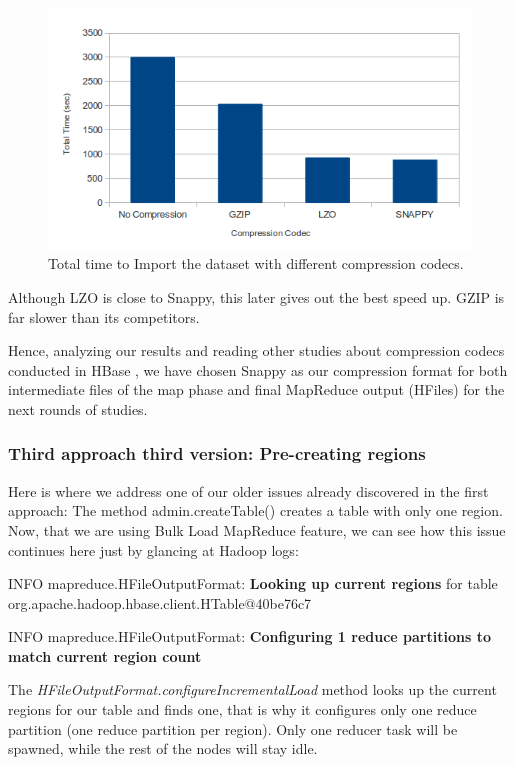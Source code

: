 \begin{figure}[htb]
\centering
\includegraphics[width=1\textwidth]{./images/codecs.png}
\caption{Total time to Import the dataset with different compression codecs.} \label{fig:codecs}
\end{figure}


Although LZO is close to Snappy, this later gives out the best speed up. GZIP is far slower than its competitors.

Hence, analyzing our results and reading other studies about compression codecs conducted in HBase \cite{CompressionComparison}, we have chosen Snappy as our compression format for both intermediate files of the map phase and final MapReduce output (HFiles) for the next rounds of studies.




\subsubsection{Third approach third version: Pre-creating regions}
Here is where we address one of our older issues already discovered in the first approach: The method admin.createTable() creates a table with only one region. Now, that we are using Bulk Load MapReduce feature, we can see how this issue continues here just by glancing at Hadoop logs:

\bigskip

INFO mapreduce.HFileOutputFormat: \textbf{Looking up current regions} for table org.apache.hadoop.hbase.client.HTable@40be76c7
\par
INFO mapreduce.HFileOutputFormat: \textbf{Configuring 1 reduce partitions to match current region count}

\bigskip

The \textit{HFileOutputFormat.configureIncrementalLoad} method looks up the current regions for our table and finds one, that is why it configures  only one reduce partition (one reduce partition per region). Only one reducer task will be spawned, while the rest of the nodes will stay idle.





